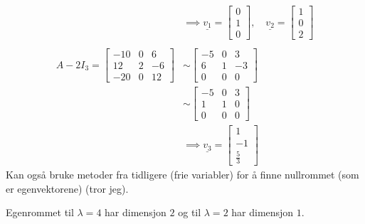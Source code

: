 \documentclass[11pt, a4paper, norsk]{article}
\begin{document}
\begin{Example}{}{}
\begin{align*}
                \\
                &\implies \underline{v_1} = \begin{bmatrix}
                    0 \\
                    1 \\
                    0
                \end{bmatrix}, \quad \underline{v_2} = \begin{bmatrix}
                    1 \\
                    0 \\
                    2
                \end{bmatrix}
                \\
                \\
                A - 2I_{3} = \begin{bmatrix}
                    -10 & 0 & 6 \\
                    12 & 2 & -6 \\
                    -20 & 0 & 12
                \end{bmatrix} &\sim \begin{bmatrix}
                -5 & 0 & 3 \\
                6 & 1 & -3 \\
                0 & 0 & 0
                \end{bmatrix}
                \\
                &\sim \begin{bmatrix}
                    -5 & 0 & 3 \\
                    1 & 1 & 0 \\
                    0 & 0 & 0
                \end{bmatrix}
                \\
                &\implies \underline{v_3} = \begin{bmatrix}
                    1 \\
                    -1 \\
                    \frac{5}{3}
                \end{bmatrix}
            \end{align*}
            Kan også bruke metoder fra tidligere (frie variabler) for å finne nullrommet (som er egenvektorene) (tror jeg).

            Egenrommet til $\lambda = 4$ har dimensjon $2$ og til $\lambda = 2$ har dimensjon $1$. 
        \end{Example}
\end{document}
